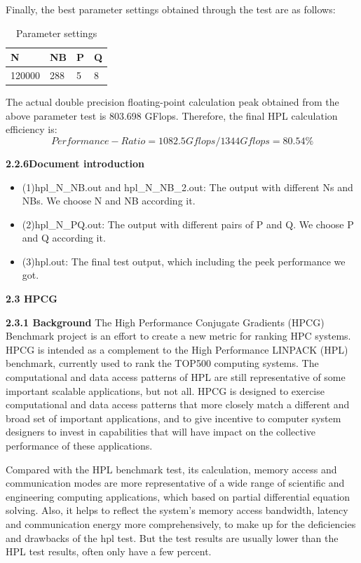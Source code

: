 \documentclass[a4paper,12pt]{article}
\begin{document}
Finally, the best parameter settings obtained through the test are as follows:
\begin{table}[H]
\centering
\caption{Parameter settings}
\begin{tabular}{|l|l|l|l|}
\hline
N & NB & P & Q \\
\hline
120000 & 288 & 5 & 8 \\
\hline
\end{tabular}
\end{table}

The actual double precision floating-point calculation peak obtained from the above parameter test is 803.698 GFlops. Therefore, the final HPL calculation efficiency is:
\begin{equation*}
Performance-Ratio = 1082.5Gflops/1344Gflops = 80.54\%
\end{equation*}

\textbf{2.2.6Document introduction}
\begin{itemize}
    \item (1)hpl\_N\_NB.out and hpl\_N\_NB\_2.out: The output with different Ns and NBs. We choose N and NB according it.
    \item (2)hpl\_N\_PQ.out: The output with different pairs of P and Q. We choose P and Q according it.
    \item (3)hpl.out: The final test output, which including the peek performance we got.
\end{itemize}

\textbf{2.3 HPCG}

\textbf{2.3.1 Background}
The High Performance Conjugate Gradients (HPCG) Benchmark project is an effort to create a new metric for ranking HPC systems. HPCG is intended as a complement to the High Performance LINPACK (HPL) benchmark, currently used to rank the TOP500 computing systems. The computational and data access patterns of HPL are still representative of some important scalable applications, but not all. HPCG is designed to exercise computational and data access patterns that more closely match a different and broad set of important applications, and to give incentive to computer system designers to invest in capabilities that will have impact on the collective performance of these applications.

Compared with the HPL benchmark test, its calculation, memory access and communication modes are more representative of a wide range of scientific and engineering computing applications, which based on partial differential equation solving. Also, it helps to reflect the system's memory access bandwidth, latency and communication energy more comprehensively, to make up for the deficiencies and drawbacks of the hpl test. But the test results are usually lower than the HPL test results, often only have a few percent.
\end{document}
